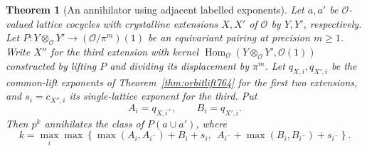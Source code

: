 \documentclass[a4paper,11pt]{article}
\newtheorem{theorem}[proposition]{Theorem}
\theoremstyle{definition}
\theoremstyle{remark}
\numberwithin{equation}{section}
\begin{document}
\begin{theorem}[An annihilator using adjacent labelled exponents]
\leavevmode\label{thm:labelledcup765}
Let \(a,a'\) be \(\mathcal O\)-valued lattice cocycles with
crystalline extensions \(X,X'\) of \(\mathcal O\) by
\(Y,Y'\), respectively. Let \(P:Y\otimes_{\mathcal O}Y'
\to(\mathcal O/\pi^m)(1)\) be an equivariant pairing at
precision \(m\ge1\). Write \(X''\) for the third extension with
kernel \(\operatorname{Hom}_{\mathcal O}(Y\otimes_{\mathcal O}Y',
\mathcal O(1))\) constructed by lifting \(P\) and dividing
its displacement by \(\pi^m\). Let \(q_{X,i},q_{X',i}\)
be the common-lift exponents of Theorem~\ref{thm:orbitlift764}
for the first two extensions, and \(s_i=c_{X'',i}\) its
single-lattice exponent for the third. Put
\[
              A_i=q_{X,i^+},\qquad B_i=q_{X',i}.
\]
Then \(p^k\) annihilates the class of \(P(a\cup a')\), where
\[
 k=\max_i\max\left\{
     \max(A_i,A_{i^-})+B_i+s_i,\ \
     A_{i^-}+\max(B_i,B_{i^-})+s_{i^-}\right\}.
\]
\end{theorem}
\end{document}
